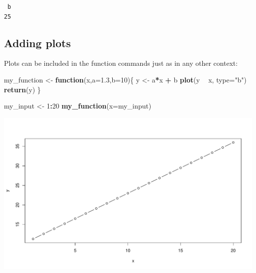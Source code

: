 \documentclass[
]{book}
\newenvironment{Shaded}{\begin{snugshade}}{\end{snugshade}}
\newcommand{\ControlFlowTok}[1]{\textcolor[rgb]{0.13,0.29,0.53}{\textbf{#1}}}
\newcommand{\DataTypeTok}[1]{\textcolor[rgb]{0.13,0.29,0.53}{#1}}
\newcommand{\DecValTok}[1]{\textcolor[rgb]{0.00,0.00,0.81}{#1}}
\newcommand{\FloatTok}[1]{\textcolor[rgb]{0.00,0.00,0.81}{#1}}
\newcommand{\KeywordTok}[1]{\textcolor[rgb]{0.13,0.29,0.53}{\textbf{#1}}}
\newcommand{\NormalTok}[1]{#1}
\newcommand{\OperatorTok}[1]{\textcolor[rgb]{0.81,0.36,0.00}{\textbf{#1}}}
\newcommand{\StringTok}[1]{\textcolor[rgb]{0.31,0.60,0.02}{#1}}
\begin{document}
\begin{verbatim}
 b 
25 
\end{verbatim}

\hypertarget{adding-plots}{%
\subsection*{Adding plots}\label{adding-plots}}

Plots can be included in the function commands just as in any other context:

\begin{Shaded}
\begin{Highlighting}[]
\NormalTok{my_function <-}\StringTok{ }\ControlFlowTok{function}\NormalTok{(x,}\DataTypeTok{a=}\FloatTok{1.3}\NormalTok{,}\DataTypeTok{b=}\DecValTok{10}\NormalTok{)\{}
\NormalTok{  y <-}\StringTok{ }\NormalTok{a}\OperatorTok{*}\NormalTok{x }\OperatorTok{+}\StringTok{ }\NormalTok{b}
  \KeywordTok{plot}\NormalTok{(y }\OperatorTok{~}\StringTok{ }\NormalTok{x, }\DataTypeTok{type=}\StringTok{"b"}\NormalTok{)}
  \KeywordTok{return}\NormalTok{(y)}
\NormalTok{\}}
\end{Highlighting}
\end{Shaded}

\begin{Shaded}
\begin{Highlighting}[]
\NormalTok{my_input <-}\StringTok{ }\DecValTok{1}\OperatorTok{:}\DecValTok{20}
\KeywordTok{my_function}\NormalTok{(}\DataTypeTok{x=}\NormalTok{my_input)}
\end{Highlighting}
\end{Shaded}

\includegraphics{figures/unnamed-chunk-217-1.pdf}
\end{document}
